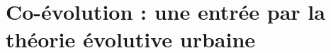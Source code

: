 



\chapter[Théorie Evolutive Urbaine]{Co-évolution : une entrée par la théorie évolutive urbaine}

\label{ch:evolutiveurban} %









